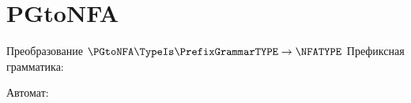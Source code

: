 \section{PGtoNFA}
\begin{frame}{Преобразование $\PGtoNFA\TypeIs\PrefixGrammarTYPE\to\NFATYPE$}
	Префиксная грамматика:


	Автомат:


\end{frame}
